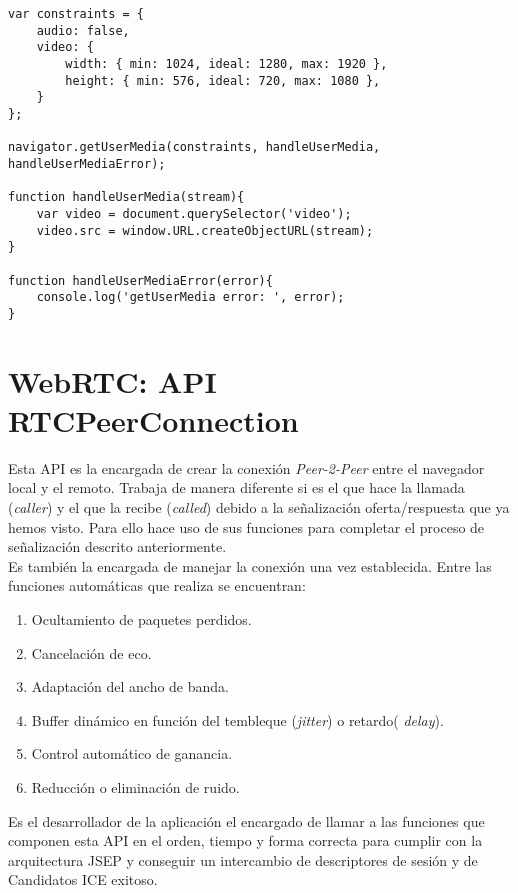 \begin{lstlisting}[caption=Llamada a función RTCPeerConnection]
var constraints = {
    audio: false,
    video: {
        width: { min: 1024, ideal: 1280, max: 1920 },
        height: { min: 576, ideal: 720, max: 1080 },
    }
};

navigator.getUserMedia(constraints, handleUserMedia, handleUserMediaError); 

function handleUserMedia(stream){
    var video = document.querySelector('video');
    video.src = window.URL.createObjectURL(stream);
}

function handleUserMediaError(error){
	console.log('getUserMedia error: ', error);
}

\end{lstlisting}

\section{WebRTC: API RTCPeerConnection}

Esta API es la encargada de crear la conexión \emph{Peer-2-Peer} entre el navegador local y el remoto. Trabaja de manera diferente si es el que hace la llamada (\textit{caller}) y el que la recibe (\textit{called}) debido a la señalización oferta/respuesta que ya hemos visto. Para ello hace uso de sus funciones para completar el proceso de señalización descrito anteriormente.\\

\noindent Es también la encargada de manejar la conexión una vez establecida. Entre las funciones automáticas que realiza se encuentran:\\

\begin{enumerate}
\item Ocultamiento de paquetes perdidos.
\item Cancelación de eco.
\item Adaptación del ancho de banda.
\item Buffer dinámico en función del tembleque (\emph{jitter}) o retardo( \emph{delay}).
\item Control automático de ganancia.
\item Reducción o eliminación de ruido.
\end{enumerate}

Es el desarrollador de la aplicación el encargado de llamar a las funciones que componen esta API en el orden, tiempo y forma correcta para cumplir con la arquitectura JSEP y conseguir un intercambio de descriptores de sesión y de Candidatos ICE exitoso.\\

